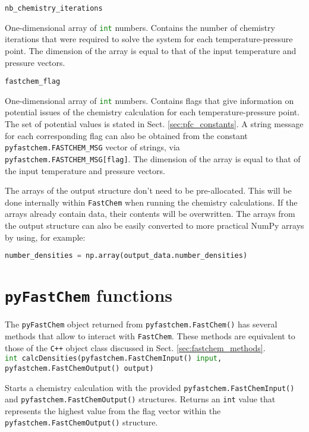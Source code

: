 \documentclass[numbers=noenddot]{fcmanual}
\newcommand{\fc}{\texttt{FastChem}\xspace}
\newcommand{\pfc}{\texttt{pyFastChem}\xspace}
\newcommand{\cpp}{\ttt{C++}\xspace}
\newcommand{\ttt}[1]{\texttt {#1}}
\begin{document}
\bigbreak

\lstinline!nb_chemistry_iterations!
\begin{addmargin}[25pt]{0pt}
	One-dimensional array of \lstinline[language=Python]!int! numbers. Contains the number of chemistry iterations that were required to solve the system for each temperature-pressure point. The dimension of the array is equal to that of the input temperature and pressure vectors.
\end{addmargin}

\bigbreak

\lstinline!fastchem_flag!
\begin{addmargin}[25pt]{0pt}
	One-dimensional array of \lstinline[language=Python]!int! numbers. Contains flags that give information on potential issues of the chemistry calculation for each temperature-pressure point. The set of potential values is stated in Sect. \ref{sec:pfc_constants}. A string message for each corresponding flag can also be obtained from the constant \lstinline!pyfastchem.FASTCHEM_MSG! vector of strings, via \lstinline!pyfastchem.FASTCHEM_MSG[flag]!. The dimension of the array is equal to that of the input temperature and pressure vectors.
\end{addmargin}

\bigbreak

The arrays of the output structure don't need to be pre-allocated. This will be done internally within \fc when running the chemistry calculations. If the arrays already contain data, their contents will be overwritten. The arrays from the output structure can also be easily converted to more practical NumPy arrays by using, for example:
\begin{lstlisting}[language=Python]
  number_densities = np.array(output_data.number_densities)
\end{lstlisting} 


\section{\pfc functions}
\label{sec:pfc_methods}

The \pfc object returned from \lstinline[language=Python]!pyfastchem.FastChem()! has several methods that allow to interact with \fc. These methods are equivalent to those of the \cpp object class discussed in Sect. \ref{sec:fastchem_methods}.\\

\lstinline[language=Python]!int calcDensities(pyfastchem.FastChemInput() input, pyfastchem.FastChemOutput() output)!
\begin{addmargin}[25pt]{0pt}
	Starts a chemistry calculation with the provided \lstinline!pyfastchem.FastChemInput()! and \lstinline!pyfastchem.FastChemOutput()! structures. Returns an \lstinline!int! value that represents the highest value from the flag vector within the \lstinline!pyfastchem.FastChemOutput()! structure.
\end{addmargin}
\end{document}
